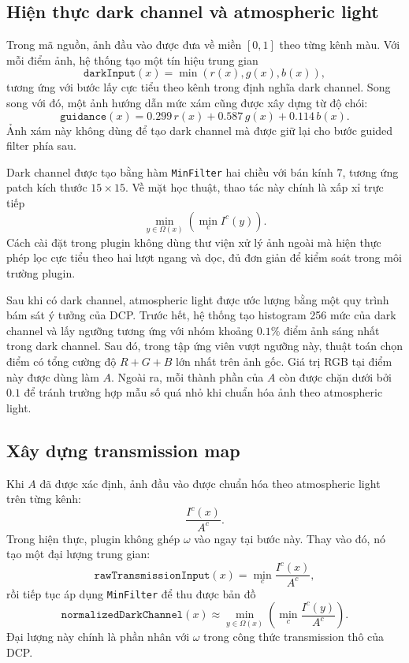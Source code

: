 \subsection{Hiện thực dark channel và atmospheric light}

Trong mã nguồn, ảnh đầu vào được đưa về miền \([0,1]\) theo từng kênh màu. Với mỗi điểm ảnh, hệ thống tạo một tín hiệu trung gian
\[
\texttt{darkInput}(x) = \min(r(x), g(x), b(x)),
\]
tương ứng với bước lấy cực tiểu theo kênh trong định nghĩa dark channel. Song song với đó, một ảnh hướng dẫn mức xám cũng được xây dựng từ độ chói:
\[
\texttt{guidance}(x)=0.299\,r(x)+0.587\,g(x)+0.114\,b(x).
\]
Ảnh xám này không dùng để tạo dark channel mà được giữ lại cho bước guided filter phía sau.

Dark channel được tạo bằng hàm \texttt{MinFilter} hai chiều với bán kính \(7\), tương ứng patch kích thước \(15\times15\). Về mặt học thuật, thao tác này chính là xấp xỉ trực tiếp
\[
\min_{y \in \Omega(x)} \left(\min_c I^c(y)\right).
\]
Cách cài đặt trong plugin không dùng thư viện xử lý ảnh ngoài mà hiện thực phép lọc cực tiểu theo hai lượt ngang và dọc, đủ đơn giản để kiểm soát trong môi trường plugin.

Sau khi có dark channel, atmospheric light được ước lượng bằng một quy trình bám sát ý tưởng của DCP. Trước hết, hệ thống tạo histogram 256 mức của dark channel và lấy ngưỡng tương ứng với nhóm khoảng \(0.1\%\) điểm ảnh sáng nhất trong dark channel. Sau đó, trong tập ứng viên vượt ngưỡng này, thuật toán chọn điểm có tổng cường độ \(R+G+B\) lớn nhất trên ảnh gốc. Giá trị RGB tại điểm này được dùng làm \(A\). Ngoài ra, mỗi thành phần của \(A\) còn được chặn dưới bởi \(0.1\) để tránh trường hợp mẫu số quá nhỏ khi chuẩn hóa ảnh theo atmospheric light.

\subsection{Xây dựng transmission map}

Khi \(A\) đã được xác định, ảnh đầu vào được chuẩn hóa theo atmospheric light trên từng kênh:
\begin{equation}
\frac{I^c(x)}{A^c}.
\end{equation}
Trong hiện thực, plugin không ghép \(\omega\) vào ngay tại bước này. Thay vào đó, nó tạo một đại lượng trung gian:
\[
\texttt{rawTransmissionInput}(x) = \min_c \frac{I^c(x)}{A^c},
\]
rồi tiếp tục áp dụng \texttt{MinFilter} để thu được bản đồ
\[
\texttt{normalizedDarkChannel}(x) \approx \min_{y\in\Omega(x)}\left(\min_c \frac{I^c(y)}{A^c}\right).
\]
Đại lượng này chính là phần nhân với \(\omega\) trong công thức transmission thô của DCP.

